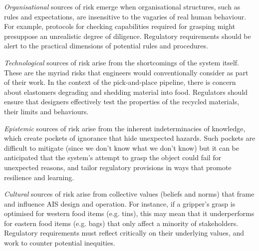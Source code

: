 \documentclass[lettersize,journal]{IEEEtran}
\begin{document}
\emph{Organisational} sources of risk emerge when organisational structures, such as rules and expectations, are insensitive to the vagaries of real human behaviour. For example, protocols for checking capabilities required for grasping might presuppose an unrealistic degree of diligence. Regulatory requirements should be alert to the practical dimensions of potential rules and procedures.

\emph{Technological} sources of risk arise from the shortcomings of the system itself. These are the myriad risks that engineers would conventionally consider as part of their work. In the context of the pick-and-place pipeline, there is concern about elastomers degrading and shedding material into food. Regulators should ensure that designers effectively test the properties of the recycled materials, their limits and behaviours.

\emph{Epistemic} sources of risk arise from the inherent indeterminacies of knowledge, which create pockets of ignorance that hide unexpected hazards. Such pockets are difficult to mitigate (since we don’t know what we don’t know) but it can be anticipated that the system’s attempt to grasp the object could fail for unexpected reasons, and tailor regulatory provisions in ways that promote resilience and learning. 

\emph{Cultural} sources of risk arise from collective values (beliefs and norms) that frame and influence AIS design and operation. For instance, if a gripper’s grasp is optimised for western food items (e.g. tins), this may mean that it underperforms for eastern food items (e.g. bags) that only affect a minority of stakeholders. Regulatory requirements must reflect critically on their underlying values, and work to counter potential inequities. 
\end{document}
